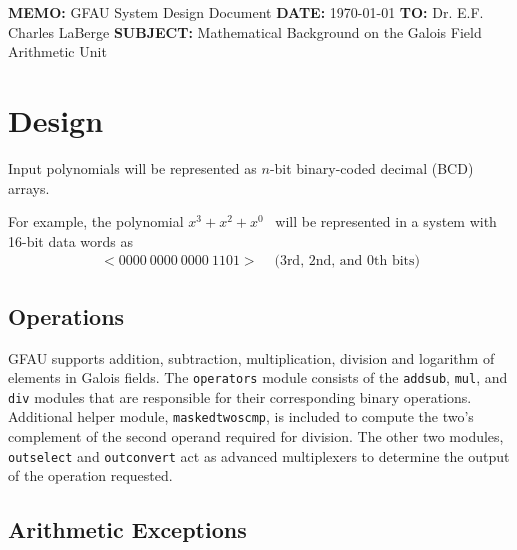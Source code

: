 \documentclass[11pt]{extarticle}
\newcommand{\examplepoly}{$x^{3}+x^{2}+x^{0}$}
\begin{document}
    \documentinfo
    {\textbf{MEMO:} GFAU System Design Document}
    {\textbf{DATE:} \today}
    {\textbf{TO:} Dr. E.F. Charles LaBerge}
    {\textbf{SUBJECT: } Mathematical Background on the Galois Field Arithmetic
    Unit}
    \vspace{-0.1in}

    

    \section{Design} Input polynomials will be represented as $n$-bit
    binary-coded decimal (BCD) arrays.

    For example, the polynomial \examplepoly~ will be represented in a system
    with 16-bit data words as
        \begin{equation*}
            \begin{split}
                <0000 \ 0000 \ 0000 \ 1101> & \text{  (3rd, 2nd, and 0th bits)}
            \end{split}
        \end{equation*}

        

        
        \subsection{Operations} GFAU supports addition, subtraction,
        multiplication, division and logarithm of elements in Galois fields.
        The \texttt{operators} module consists of the \texttt{addsub},
        \texttt{mul}, and \texttt{div} modules that are responsible for their
        corresponding binary operations. Additional helper module,
        \texttt{maskedtwoscmp}, is included to compute the two's complement of
        the second operand required for division. The other two modules,
        \texttt{outselect} and \texttt{outconvert} act as advanced multiplexers
        to determine the output of the operation requested.

        
        
        
        

        \subsection{Arithmetic Exceptions}

        
        

        
        
\end{document}
